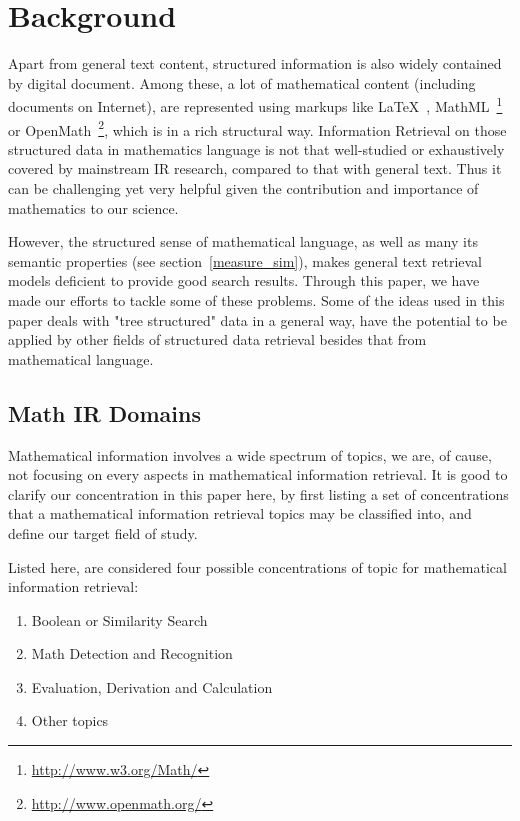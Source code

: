 \chapter{Background}

Apart from general text content, structured information is also widely contained by digital document. Among these, a lot of mathematical content (including documents on Internet), are represented using markups like \LaTeX\  , MathML~\footnote{\url{http://www.w3.org/Math/}} or OpenMath~\footnote{\url{http://www.openmath.org/}}, which is in a rich structural way. 
Information Retrieval on those structured data in mathematics language is not that well-studied or exhaustively covered by mainstream IR research, compared to that with general text. 
Thus it can be challenging yet very helpful given the contribution and importance of mathematics to our science. 

However, the structured sense of mathematical language, as well as many its semantic properties (see section~\ref{measure_sim}), makes general text retrieval models deficient to provide good search results. Through this paper, we have made our efforts to tackle some of these problems. 
Some of the ideas used in this paper deals with "tree structured" data in a general way, have the potential to be applied by other fields of structured data retrieval besides that from mathematical language. 

\section{Math IR Domains}

Mathematical information involves a wide spectrum of topics, 
we are, of cause, not focusing on every aspects in mathematical information retrieval. 
It is good to clarify our concentration in this paper here, by first listing a set of concentrations that a mathematical information retrieval topics may be classified into,
and define our target field of study.

\pagebreak
Listed here, are considered four possible concentrations of topic for mathematical information retrieval:

\begin{enumerate}
\item Boolean or Similarity Search
\item Math Detection and Recognition
\item Evaluation, Derivation and Calculation
\item Other topics 
\end{enumerate}

